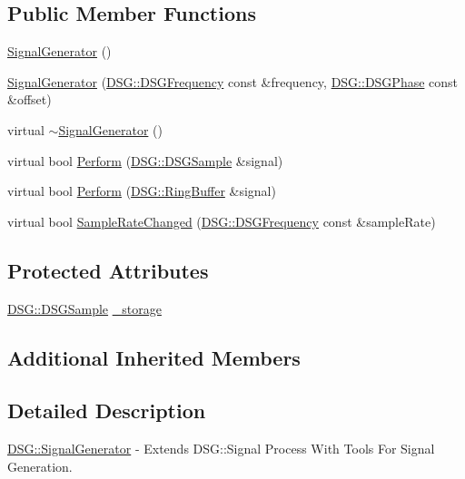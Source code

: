 \subsection*{Public Member Functions}
\begin{DoxyCompactItemize}
\item 
\hyperlink{class_d_s_g_1_1_signal_generator_a13ebda67fcdc880ef41aff501cc23fc3}{Signal\+Generator} ()
\item 
\hyperlink{class_d_s_g_1_1_signal_generator_a4036fceff5c05a3711b8516d850c414c}{Signal\+Generator} (\hyperlink{namespace_d_s_g_a4315a061386fa1014fda09b15d3a6973}{D\+S\+G\+::\+D\+S\+G\+Frequency} const \&frequency, \hyperlink{namespace_d_s_g_a44431ce1eb0a7300efdd207bc879e52c}{D\+S\+G\+::\+D\+S\+G\+Phase} const \&offset)
\item 
virtual \hyperlink{class_d_s_g_1_1_signal_generator_a7b52d391974bc36a19fdcf617ad976cb}{$\sim$\+Signal\+Generator} ()
\item 
virtual bool \hyperlink{class_d_s_g_1_1_signal_generator_a46fe75a81a242e191c5049d33ddf4155}{Perform} (\hyperlink{namespace_d_s_g_ac39a94cd27ebcd9c1e7502d0c624894a}{D\+S\+G\+::\+D\+S\+G\+Sample} \&signal)
\item 
virtual bool \hyperlink{class_d_s_g_1_1_signal_generator_ab050f80e84e6c8b3e354b56930d6a02b}{Perform} (\hyperlink{class_d_s_g_1_1_ring_buffer}{D\+S\+G\+::\+Ring\+Buffer} \&signal)
\item 
virtual bool \hyperlink{class_d_s_g_1_1_signal_generator_ab878f70be78d7b61beb2c6787845457a}{Sample\+Rate\+Changed} (\hyperlink{namespace_d_s_g_a4315a061386fa1014fda09b15d3a6973}{D\+S\+G\+::\+D\+S\+G\+Frequency} const \&sample\+Rate)
\end{DoxyCompactItemize}
\subsection*{Protected Attributes}
\begin{DoxyCompactItemize}
\item 
\hyperlink{namespace_d_s_g_ac39a94cd27ebcd9c1e7502d0c624894a}{D\+S\+G\+::\+D\+S\+G\+Sample} \hyperlink{class_d_s_g_1_1_signal_generator_a28a9b47a1aa0783029f11a19ba0363f2}{\+\_\+storage}
\end{DoxyCompactItemize}
\subsection*{Additional Inherited Members}


\subsection{Detailed Description}
\hyperlink{class_d_s_g_1_1_signal_generator}{D\+S\+G\+::\+Signal\+Generator} -\/ Extends D\+S\+G\+::\+Signal Process With Tools For Signal Generation. 

